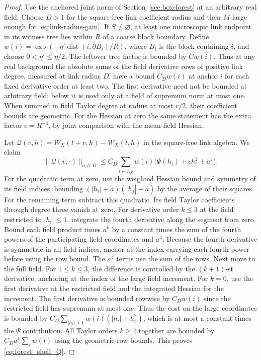 \documentclass[11pt]{article}
\begin{document}
\begin{proof}
Use the anchored joint norm of Section~\ref{sec:box-forest} at
an arbitrary real field. Choose \(D>1\) for the square-free link
coefficient radius and then \(M\) large enough for
\eqref{eq:link-radius-gain}. If \(S\ne\varnothing\), at least one
microscopic link endpoint in its witness tree lies within
\(R\) of a coarse block boundary. Define
\(w(i)=\exp(-\eta'\operatorname{dist}(i,\partial B_i)/R)\),
where \(B_i\) is the block containing \(i\), and choose
\(0<\eta'\le\eta/2\). The leftover tree factor is bounded by
\(Cw(i)\). Thus at any real background the absolute sums of the
field derivative rows of positive link degree, measured at link
radius \(D\), have a bound \(C_Dw(i)\) at anchor \(i\) for each
fixed derivative order at least two. The first derivative need not
be bounded at arbitrary field; below it is used only at a field
of supremum norm at most one. When summed in field Taylor degree at
radius at most \(r/2\), their coefficient bounds are geometric.
For the Hessian at zero the same statement has the extra factor
\(\epsilon=R^{-4}\), by joint comparison with the mean-field Hessian.

Let \(\mathcal Q(v,h)=W_X(t+v,h)-W_X(t,h)\) in the square-free
link algebra. We claim
\begin{equation}\label{eq:forest_shell_Q}
 \|\mathcal Q(v,\cdot)\|_{a,h;D}
 \le C_D\sum_{i\in\Lambda_X}w(i)
          \big(\Psi(h_i)+\epsilon h_i^2+a^4\big).
\end{equation}
For the quadratic term at zero, use the weighted Hessian
bound and symmetry of its field indices, bounding
\((|h_i|+a)(|h_j|+a)\) by the average of their squares.
For the remaining term subtract this quadratic. Its field
Taylor coefficients through degree three vanish at zero.
For derivative order \(k\le3\) at the field restricted to
\(|h_i|\le1\), integrate the fourth derivative along the
segment from zero. Bound each field product times \(a^k\)
by a constant times the sum of the fourth powers of the
participating field coordinates and \(a^4\). Because the
fourth derivative is symmetric in all field indices, anchor
at the index carrying each fourth power before using the row
bound. The \(a^4\) terms use the sum of the rows. Next move
to the full field. For \(1\le k\le3\), the difference is
controlled by the \((k+1)\)-st derivative, anchoring at the
index of the large field increment. For \(k=0\), use the
first derivative at the restricted field and the integrated
Hessian for the increment. The first derivative is bounded
rowwise by \(C_Dw(i)\) since the restricted field has supremum
at most one. Thus the cost on the large coordinates is bounded
by \(C_D\sum_{|h_i|>1}w(i)(|h_i|+h_i^2)\), which is at most a
constant times the \(\Psi\) contribution. All Taylor orders
\(k\ge4\) together are bounded by \(C_Da^4\sum_i w(i)\) using the
geometric row bounds. This proves \eqref{eq:forest_shell_Q}.


\end{proof}
\end{document}
